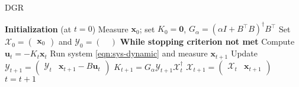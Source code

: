 \documentclass[journal]{IEEEtran}
\theoremstyle{definition}
\theoremstyle{remark}
\newcommand\x{{\bm x}}
\def\u{{\bm u}}
\begin{document}
%
%
\begin{algorithm}[!t]
	\caption{\acf{DGR}}
	\begin{algorithmic}[1]
		\State \textbf{Initialization} \hspace{1mm} (at $t=0$)
		\State \hspace{5mm} Measure $\x_0$; set $K_0 = \mathbf{0}$, {$G_\alpha = (\alpha I + B^\intercal B)^\dagger B^\intercal$}
		\State \hspace{5mm} Set $\mathcal{X}_0 = \left(\begin{array}{c} \x_0 \end{array}\right)$ and $\mathcal{Y}_0 = \left(\begin{array}{c} \ \end{array}\right)$
		\State \textbf{While stopping criterion not met}\footnotemark
		\State \hspace{5mm} Compute \hspace{1mm} $\u_t = -K_t \x_t$
		\State \hspace{5mm} Run system \eqref{eqn:sys-dynamic} and measure $\x_{t+1}$
		\State \hspace{5mm} Update \hspace{1mm} $\mathcal{Y}_{t+1} =
	    \left(\begin{array}{cc}
		\mathcal{Y}_t & \x_{t+1} - B \u_t
		\end{array}\right)$
		\State \hspace{18mm} $K_{t+1} = G_\alpha \mathcal{Y}_{t+1} \mathcal{X}_t^{\dagger}$
		\State \hspace{18.5mm} $\mathcal{X}_{t+1} = \left(\begin{array}{cc}
			\mathcal{X}_t & \x_{t+1}
		\end{array}\right)$
		\State \hspace{5mm} $t = t+1$
	\end{algorithmic}
	\label{alg:Controller}
\end{algorithm}
\end{document}
